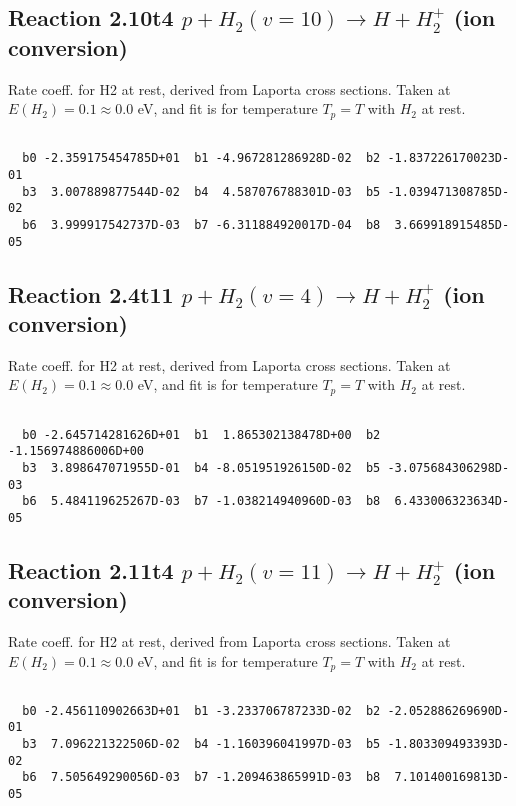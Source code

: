 \documentclass[12pt,dvipdfmx]{article}
\begin{document}
\newpage
\subsection{
Reaction 2.10t4
$ p + H_2(v=10) \rightarrow H + H_2^+$ (ion conversion)
}
Rate coeff. for H2 at rest, derived from Laporta cross sections.
Taken at $E(H_2) = 0.1 \approx 0.0$ eV,  and fit is for temperature $T_p=T$ with $H_2$ at rest.

\begin{small}\begin{verbatim}

  b0 -2.359175454785D+01  b1 -4.967281286928D-02  b2 -1.837226170023D-01
  b3  3.007889877544D-02  b4  4.587076788301D-03  b5 -1.039471308785D-02
  b6  3.999917542737D-03  b7 -6.311884920017D-04  b8  3.669918915485D-05

\end{verbatim}\end{small}

\newpage
\subsection{
Reaction 2.4t11
$ p + H_2(v=4) \rightarrow H + H_2^+$ (ion conversion)
}
Rate coeff. for H2 at rest, derived from Laporta cross sections.
Taken at $E(H_2) = 0.1 \approx 0.0$ eV,  and fit is for temperature $T_p=T$ with $H_2$ at rest.

\begin{small}\begin{verbatim}

  b0 -2.645714281626D+01  b1  1.865302138478D+00  b2 -1.156974886006D+00
  b3  3.898647071955D-01  b4 -8.051951926150D-02  b5 -3.075684306298D-03
  b6  5.484119625267D-03  b7 -1.038214940960D-03  b8  6.433006323634D-05

\end{verbatim}\end{small}

\newpage
\subsection{
Reaction 2.11t4
$ p + H_2(v=11) \rightarrow H + H_2^+$ (ion conversion)
}
Rate coeff. for H2 at rest, derived from Laporta cross sections.
Taken at $E(H_2) = 0.1 \approx 0.0$ eV,  and fit is for temperature $T_p=T$ with $H_2$ at rest.

\begin{small}\begin{verbatim}

  b0 -2.456110902663D+01  b1 -3.233706787233D-02  b2 -2.052886269690D-01
  b3  7.096221322506D-02  b4 -1.160396041997D-03  b5 -1.803309493393D-02
  b6  7.505649290056D-03  b7 -1.209463865991D-03  b8  7.101400169813D-05

\end{verbatim}\end{small}
\end{document}
